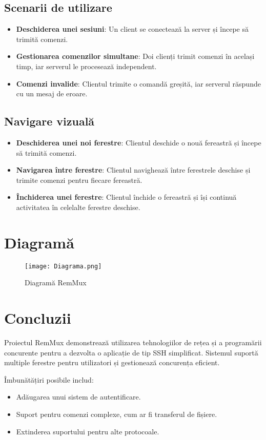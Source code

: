 \documentclass[runningheads]{llncs}
\begin{document}
\subsection{Scenarii de utilizare}
\begin{itemize}
    \item \textbf{Deschiderea unei sesiuni}: Un client se conectează la server și începe să trimită comenzi.
    \item \textbf{Gestionarea comenzilor simultane}: Doi clienți trimit comenzi în același timp, iar serverul le procesează independent.
    \item \textbf{Comenzi invalide}: Clientul trimite o comandă greșită, iar serverul răspunde cu un mesaj de eroare.
\end{itemize}
\subsection{Navigare vizuală}
\begin{itemize}
\item \textbf{Deschiderea unei noi ferestre}: Clientul deschide o nouă fereastră și începe să trimită comenzi.
\item \textbf{Navigarea între ferestre}: Clientul navighează între ferestrele deschise și trimite comenzi pentru fiecare fereastră.
\item \textbf{Închiderea unei ferestre}: Clientul închide o fereastră și își continuă activitatea în celelalte ferestre deschise.
\end{itemize}

\section{Diagramă}

\begin{figure}[h]
    \centering
    \texttt{[image: Diagrama.png]}
    \caption{Diagramă RemMux}
    \label{fig:arch}
\end{figure}

\section{Concluzii}
Proiectul RemMux demonstrează utilizarea tehnologiilor de rețea și a programării concurente pentru a dezvolta o aplicație de tip SSH simplificat. Sistemul suportă multiple ferestre pentru utilizatori și gestionează concurența eficient. 

Îmbunătățiri posibile includ:
\begin{itemize}
    \item Adăugarea unui sistem de autentificare.
    \item Suport pentru comenzi complexe, cum ar fi transferul de fișiere.
    \item Extinderea suportului pentru alte protocoale.
\end{itemize}
\end{document}
